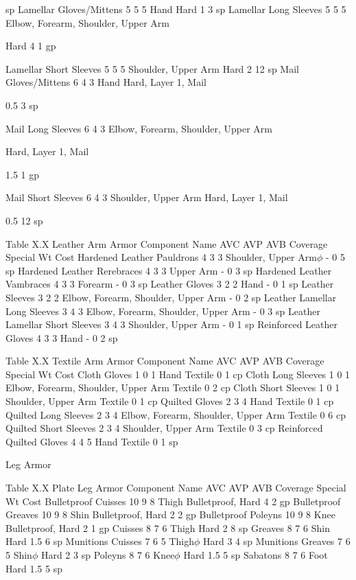 \documentclass[oneside,11pt,english]{book}
\begin{document}
sp 
Lamellar Gloves/Mittens 5 5 5 Hand Hard 1 3 sp 
Lamellar Long Sleeves 5 5 5 Elbow, Forearm, Shoulder, Upper 
Arm 

Hard 4 1 gp 

Lamellar Short Sleeves 5 5 5 Shoulder, Upper Arm Hard 2 12 
sp 
Mail Gloves/Mittens 6 4 3 Hand Hard, Layer 1, 
Mail 

0.5 3 sp 

Mail Long Sleeves 6 4 3 Elbow, Forearm, Shoulder, Upper 
Arm 

Hard, Layer 1, 
Mail 

1.5 1 gp 

Mail Short Sleeves 6 4 3 Shoulder, Upper Arm Hard, Layer 1, 
Mail 

0.5 12 
sp 

 
Table X.X Leather Arm Armor 
Component Name AVC AVP AVB Coverage Special Wt Cost 
Hardened Leather Pauldrons 4 3 3 Shoulder, Upper Arm$\phi$ - 0 5 sp 
Hardened Leather Rerebraces 4 3 3 Upper Arm - 0 3 sp 
Hardened Leather Vambraces 4 3 3 Forearm - 0 3 sp 
Leather Gloves 3 2 2 Hand - 0 1 sp 
Leather Sleeves 3 2 2 Elbow, Forearm, Shoulder, Upper Arm - 0 2 sp 
Leather Lamellar Long Sleeves 3 4 3 Elbow, Forearm, Shoulder, Upper Arm - 0 3 sp 
Leather Lamellar Short Sleeves 3 4 3 Shoulder, Upper Arm - 0 1 sp 
Reinforced Leather Gloves 4 3 3 Hand - 0 2 sp 

 
Table X.X Textile Arm Armor 
Component Name AVC AVP AVB Coverage Special Wt Cost 
Cloth Gloves 1 0 1 Hand Textile 0 1 cp 
Cloth Long Sleeves 1 0 1 Elbow, Forearm, Shoulder, Upper Arm Textile 0 2 cp 
Cloth Short Sleeves 1 0 1 Shoulder, Upper Arm Textile 0 1 cp 
Quilted Gloves 2 3 4 Hand Textile 0 1 cp 
Quilted Long Sleeves 2 3 4 Elbow, Forearm, Shoulder, Upper Arm Textile 0 6 cp 
Quilted Short Sleeves 2 3 4 Shoulder, Upper Arm Textile 0 3 cp 
Reinforced Quilted Gloves 4 4 5 Hand Textile 0 1 sp 

 


Leg Armor 

 

Table X.X Plate Leg Armor 
Component Name AVC AVP AVB Coverage Special Wt Cost 
Bulletproof Cuisses 10 9 8 Thigh Bulletproof, Hard 4 2 gp 
Bulletproof Greaves 10 9 8 Shin Bulletproof, Hard 2 2 gp 
Bulletproof Poleyns 10 9 8 Knee Bulletproof, Hard 2 1 gp 
Cuisses 8 7 6 Thigh Hard 2 8 sp 
Greaves 8 7 6 Shin Hard 1.5 6 sp 
Munitions Cuisses 7 6 5 Thigh$\phi$ Hard 3 4 sp 
Munitions Greaves 7 6 5 Shin$\phi$ Hard 2 3 sp 
Poleyns 8 7 6 Knee$\phi$ Hard 1.5 5 sp 
Sabatons 8 7 6 Foot Hard 1.5 5 sp 
\end{document}
